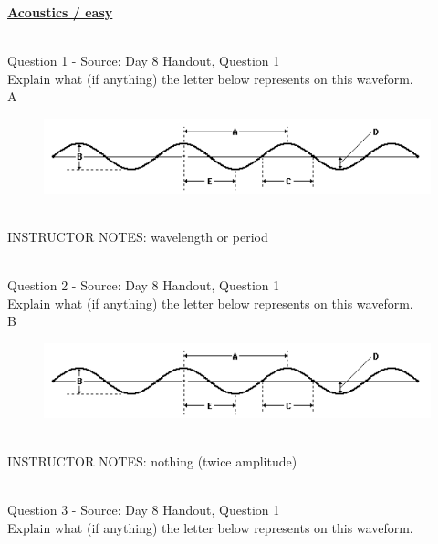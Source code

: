 \documentclass[12pt]{article}
\begin{document}
\newpage\textbf{\underline{\huge Acoustics / easy\\}}

~\\

{\large Question 1} - Source: Day 8 Handout, Question 1\\

Explain what (if anything) the letter below represents on this waveform.\\

A

\begin{figure}[H]
\includegraphics{../images/sinusoid.png}
\end{figure}

~\\
INSTRUCTOR NOTES: wavelength or period


~\\

{\large Question 2} - Source: Day 8 Handout, Question 1\\

Explain what (if anything) the letter below represents on this waveform.\\

B

\begin{figure}[H]
\includegraphics{../images/sinusoid.png}
\end{figure}

~\\
INSTRUCTOR NOTES: nothing (twice amplitude)


~\\

{\large Question 3} - Source: Day 8 Handout, Question 1\\

Explain what (if anything) the letter below represents on this waveform.\\
\end{document}
